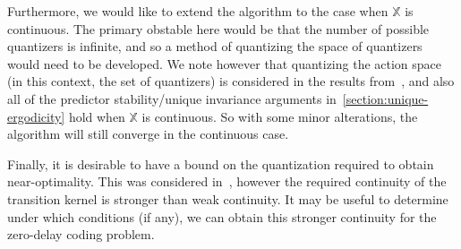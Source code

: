 \documentclass{article}
\begin{document}
Furthermore, we would like to extend the algorithm to the case when \( \mathbb{X} \) is continuous. The primary obstable here would be that the number of possible quantizers is infinite, and so a method of quantizing the space of quantizers would need to be developed. We note however that quantizing the action space (in this context, the set of quantizers) is considered in the results from~\cite{Kara}, and also all of the predictor stability/unique invariance arguments in~\ref{section:unique-ergodicity} hold when \( \mathbb{X} \) is continuous. So with some minor alterations, the algorithm will still converge in the continuous case.

Finally, it is desirable to have a bound on the quantization required to obtain near-optimality. This was considered in~\cite{Kara}, however the required continuity of the transition kernel is stronger than weak continuity. It may be useful to determine under which conditions (if any), we can obtain this stronger continuity for the zero-delay coding problem.

\newpage
\printbibliography
\end{document}
